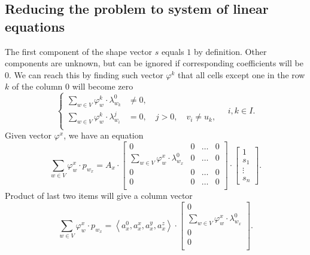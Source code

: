 \subsection{Reducing the problem to system of linear equations}
The first component of the shape vector $s$ equals $1$ by definition.
Other components are unknown,
but can be ignored if corresponding coefficients will be $0$.
We can reach this by finding such vector $\varphi^k$
that all cells except one in the row $k$ of the column $0$ will become zero
\begin{equation*}
  \begin{cases}
    \sum\limits_{w \in V} \varphi_w^k \cdot \lambda_{w_k}^0 &\neq 0, \\
    \sum\limits_{w \in V} \varphi_w^k \cdot \lambda_{w_i}^j &= 0,
      \quad j > 0,
      \quad v_i \neq u_k, \\
  \end{cases}
  \quad i, k \in I.
\end{equation*}
Given vector $\varphi^x$, we have an equation
\begin{equation*}
  \sum\limits_{w \in V} \varphi_w^x \cdot p_{w_x}
  = A_x
    \cdot \begin{bmatrix}
      0                                     & 0 & \dots & 0 \\
      \sum\limits_{w \in V} \varphi_w^x
        \cdot \lambda^0_{w_x} & 0 & \dots   & 0 \\
      0                                     & 0 & \dots & 0 \\
      0                                     & 0 & \dots & 0 \\
    \end{bmatrix}
    \cdot \begin{bmatrix}
      1 \\
      s_1 \\
      \vdots \\
      s_n
    \end{bmatrix}.
\end{equation*}
Product of last two items will give a column vector
\begin{equation*}
  \sum\limits_{w \in V} \varphi_w^x \cdot p_{w_x}
  = \left\langle a^0_x, a_x^x, a_x^y, a_x^z \right\rangle
    \cdot \begin{bmatrix}
      0 \\
      \sum\limits_{w \in V} \varphi_w^x
        \cdot \lambda^0_{w_x}               \\
      0                                     \\
      0                                     \\
    \end{bmatrix}.
\end{equation*}
